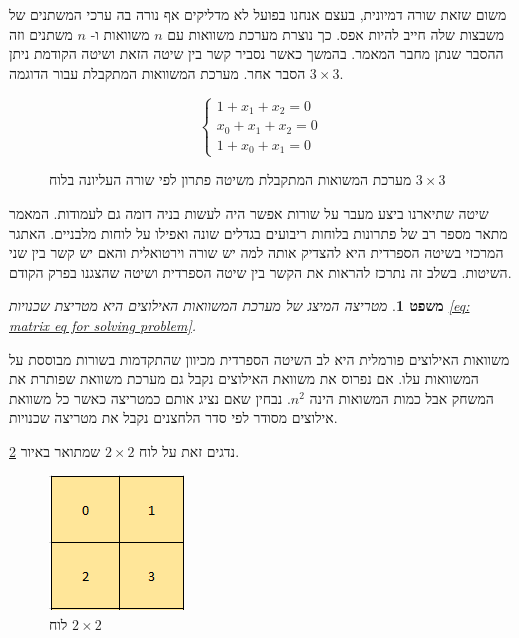 \documentclass[12pt,leqno]{article}
\newtheorem{theorem}{משפט}[section]
\begin{document}
משום שזאת שורה דמיונית, 
בעצם אנחנו בפועל לא מדליקים אף נורה בה ערכי המשתנים של משבצות
שלה חייב להיות אפס.
כך נוצרת מערכת משוואות עם 
$n$
משוואות ו- 
$n$
משתנים וזה ההסבר שנתן מחבר המאמר. 
בהמשך כאשר נסביר קשר בין שיטה הזאת ושיטה הקודמת ניתן הסבר אחר. 
מערכת המשוואות המתקבלת עבור הדוגמה
$3 \times 3$.
\begin{figure}
    \caption{
        מערכת המשואות המתקבלת משיטה פתרון לפי שורה העליונה
        בלוח 
        $3 \times 3$
    }
    \label{fig: eq system for spanish method 3 x 3}
    
    \[\begin{cases}
        1+x_{1}+x_{2}=0\\
        x_0 + x_1 + x_2 = 0\\
        1 + x_0 + x_1 = 0
        \end{cases} \]
\end{figure}

שיטה שתיארנו ביצע מעבר על שורות אפשר היה לעשות בניה דומה גם לעמודות.
המאמר 
\cite{B1}
מתאר מספר רב של פתרונות  בלוחות ריבועים בגדלים שונה ואפילו על לוחות מלבניים.
האתגר המרכזי בשיטה הספרדית היא להצדיק אותה למה יש שורה וירטואלית
והאם יש קשר בין שני השיטות.
בשלב זה נתרכז להראות את הקשר בין שיטה הספרדית ושיטה שהצגנו בפרק הקודם.
\begin{theorem}
    מטריצה המיצג של מערכת המשוואות האילוצים היא מטריצת שכנויות
    \ref{eq: matrix eq for solving problem}.
\end{theorem}
משוואות האילוצים פורמלית היא לב השיטה הספרדית
מכיוון שהתקדמות בשורות מבוססת על המשוואות עלו.
אם נפרוס את משוואת האילוצים נקבל גם מערכת משוואת שפותרת את המשחק
אבל כמות המשואות הינה 
$n^2$.
נבחין שאם נציג אותם כמטריצה כאשר כל משוואת אילוצים מסודר לפי סדר הלחצנים נקבל את מטריצה שכנויות.

נדגים זאת על לוח 
$2 \times 2$
שמתואר באיור
\ref{fig: 2 x 2 board}.

\begin{figure}[ht]
    \caption{לוח 
    $2 \times 2$
    }
    \label{fig: 2 x 2 board}
    \centering
    \includegraphics[width=.3\textwidth,height=.3\textheight,keepaspectratio]{images/2x2_board.PNG}
\end{figure}
\end{document}
